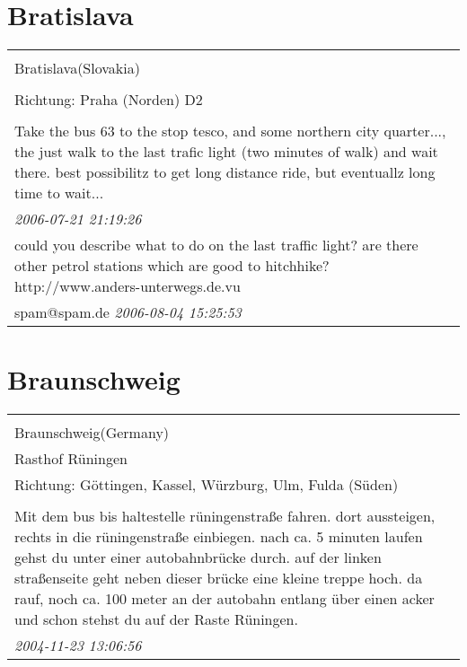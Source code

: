\documentclass[a4paper,12pt]{article}
\begin{document}
\section{Bratislava}
\begin{tabular}{|p{13cm}|}
\hline\\
Bratislava(Slovakia)\\
\\
Richtung: Praha (Norden) D2 \\
\hline\\
Take the bus 63 to the stop tesco, and some northern city quarter..., the just walk to the last trafic light (two minutes of walk) and wait there. best possibilitz to get long distance ride, but eventuallz long time to wait... \\
\textit{ 2006-07-21 21:19:26 }\\\hline could you describe what to do on the last traffic light? are there other petrol stations which are good to hitchhike?
http://www.anders-unterwegs.de.vu \\
spam@spam.de \textit{ 2006-08-04 15:25:53 }\\\hline
\end{tabular}


\section{Braunschweig}
\begin{tabular}{|p{13cm}|}
\hline\\
Braunschweig(Germany)\\
Rasthof Rüningen\\
Richtung: Göttingen, Kassel, Würzburg, Ulm, Fulda (Süden) \\
\hline\\
Mit dem bus bis haltestelle rüningenstraße fahren. dort aussteigen, rechts in die rüningenstraße einbiegen. nach ca. 5 minuten laufen gehst du unter einer autobahnbrücke durch. auf der linken straßenseite geht neben dieser brücke eine kleine treppe hoch. da rauf, noch ca. 100 meter an der autobahn entlang über einen acker und schon stehst du auf der Raste Rüningen. \\
\textit{ 2004-11-23 13:06:56 }\\\hline
\end{tabular}
\end{document}

